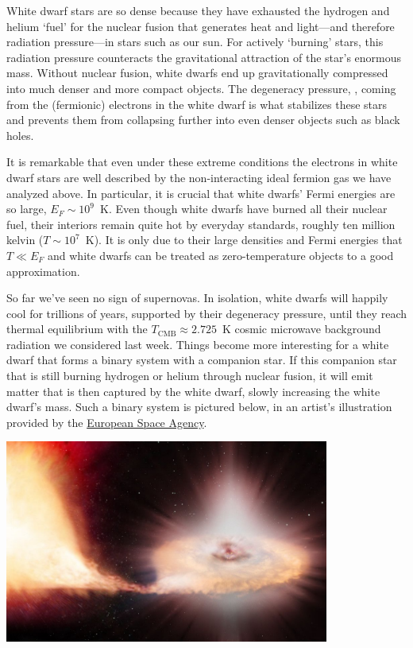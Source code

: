White dwarf stars are so dense because they have exhausted the hydrogen and helium `fuel' for the nuclear fusion that generates heat and light---and therefore radiation pressure---in stars such as our sun.
For actively `burning' stars, this radiation pressure counteracts the gravitational attraction of the star's enormous mass.
Without nuclear fusion, white dwarfs end up gravitationally compressed into much denser and more compact objects.
The degeneracy pressure, , coming from the (fermionic) electrons in the white dwarf is what stabilizes these stars and prevents them from collapsing further into even denser objects such as black holes.

It is remarkable that even under these extreme conditions the electrons in white dwarf stars are well described by the non-interacting ideal fermion gas we have analyzed above.
In particular, it is crucial that white dwarfs' Fermi energies are so large, $E_F \sim 10^9$~K.
Even though white dwarfs have burned all their nuclear fuel, their interiors remain quite hot by everyday standards, roughly ten million kelvin ($T \sim 10^7$~K). %
It is only due to their large densities and Fermi energies that $T \ll E_F$ and white dwarfs can be treated as zero-temperature objects to a good approximation.

So far we've seen no sign of supernovas.
In isolation, white dwarfs will happily cool for trillions of years, supported by their degeneracy pressure, until they reach thermal equilibrium with the $T_{\text{CMB}} \approx 2.725$~K cosmic microwave background radiation we considered last week. %
Things become more interesting for a white dwarf that forms a binary system with a companion star.
If this companion star that is still burning hydrogen or helium through nuclear fusion, it will emit matter that is then captured by the white dwarf, slowly increasing the white dwarf's mass.
Such a binary system is pictured below, in an artist's illustration provided by the \href{https://www.esa.int/ESA_Multimedia/Images/2014/09/Artist_s_impression_of_Type_Ia_supernova}{European Space Agency}.

\begin{center}\includegraphics[width=0.8\textwidth]{figs/unit08_nova.pdf}\end{center}

